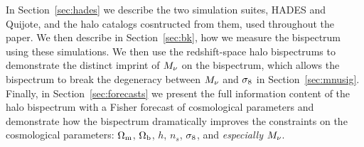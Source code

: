 In Section~\ref{sec:hades} we describe the two simulation suites, HADES and Quijote, 
and the halo catalogs cosntructed from them, used throughout the paper. We then 
describe in Section~\ref{sec:bk}, how we measure the bispectrum using these simulations. 
We then use the redshift-space halo bispectrums to demonstrate the distinct imprint of 
$M_\nu$ on the bispectrum, which allows the bispectrum to break the degeneracy between 
$M_\nu$ and $\sigma_8$ in Section~\ref{sec:mnusig}. Finally, in Section~\ref{sec:forecasts} 
we present the full information content of the halo bispectrum with a Fisher forecast 
of cosmological parameters and demonstrate how the bispectrum dramatically improves 
the constraints on the cosmological parameters: $\Omega_{\rm m}$, $\Omega_{\rm b}$, $h$, $n_s$, $\sigma_8$, and {\em especially} $M_\nu$. 

